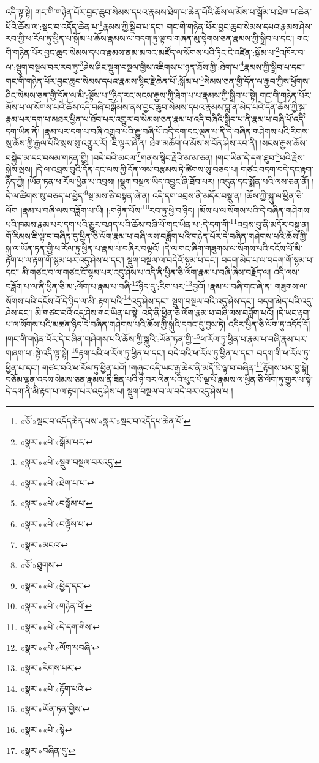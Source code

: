 འདི་ལྟ་སྟེ། གང་གི་གཉེན་པོར་བྱང་ཆུབ་སེམས་དཔའ་རྣམས་ཐེག་པ་ཆེན་པོའི་ཆོས་ལ་མོས་པ་སྒོམ་པ་ཐེག་པ་ཆེན་པོའི་ཆོས་ལ་:སྡང་བ་འདོད་ཆེན་པ་\footnote{«ཅོ་»སྡང་བ་འདོདཆེན་པས་«སྣར་»སྡང་བ་འདོདཔ་ཆེན་པོ་}རྣམས་ཀྱི་སྒྲིབ་པ་དང་། གང་གི་གཉེན་པོར་བྱང་ཆུབ་སེམས་དཔའ་རྣམས་ཤེས་རབ་ཀྱི་ཕ་རོལ་ཏུ་ཕྱིན་པ་སྒོམ་པ་ཆོས་རྣམས་ལ་བདག་ཏུ་ལྟ་བ་གཞན་མུ་སྟེགས་ཅན་རྣམས་ཀྱི་སྒྲིབ་པ་དང་། གང་གི་གཉེན་པོར་བྱང་ཆུབ་སེམས་དཔའ་རྣམས་ནམ་མཁའ་མཛོད་ལ་སོགས་པའི་ཏིང་ངེ་འཛིན་:སྒོམ་པ་\footnote{«སྣར་»«པེ་»སྒོམ་པར་}འཁོར་བ་ལ་:སྡུག་བསྔལ་བར་རབ་ཏུ་\footnote{«སྣར་»«པེ་»སྡུག་བསྔལ་བརའདུ་}ཤེས་ཤིང་སྡུག་བསྔལ་གྱིས་འཇིགས་པ་ཉན་ཐོས་ཀྱི་:ཐེག་པ་\footnote{«སྣར་»«པེ་»ཐེག་པ་པ་}རྣམས་ཀྱི་སྒྲིབ་པ་དང་། གང་གི་གཉེན་པོར་བྱང་ཆུབ་སེམས་དཔའ་རྣམས་སྙིང་རྗེ་ཆེན་པོ་:སྒོམ་པ་\footnote{«སྣར་»«པེ་»བསྒོམ་པ་}སེམས་ཅན་གྱི་དོན་ལ་རྒྱབ་ཀྱིས་ཕྱོགས་ཤིང་སེམས་ཅན་གྱི་དོན་ལ་མི་:ལྟོས་པ་\footnote{«སྣར་»«པེ་»བལྟོས་པ་}ཉིད་རང་སངས་རྒྱས་ཀྱི་ཐེག་པ་པ་རྣམས་ཀྱི་སྒྲིབ་པ་སྟེ། གང་གི་གཉེན་པོར་མོས་པ་ལ་སོགས་པའི་ཆོས་འདི་བཞི་བསྒོམས་ནས་བྱང་ཆུབ་སེམས་དཔའ་རྣམས་བླ་ན་མེད་པའི་དོན་ཆོས་ཀྱི་སྐུ་རྣམ་པར་དག་པ་མཐར་ཕྱིན་པ་ཐོབ་པར་འགྱུར་བ་སེམས་ཅན་རྣམ་པ་འདི་བཞིའི་སྒྲིབ་པ་ནི་རྣམ་པ་བཞི་པོ་འདི་དག་ཡིན་ནོ། །རྣམ་པར་དག་པ་བཞི་འགྲུབ་པའི་རྒྱུ་བཞི་པོ་འདི་དག་དང་ལྡན་པ་ནི་དེ་བཞིན་གཤེགས་པའི་རིགས་སུ་ཆོས་ཀྱི་རྒྱལ་པོའི་སྲས་སུ་འགྱུར་རོ། །ཇི་ལྟར་ཞེ་ན། ཐེག་མཆོག་ལ་མོས་ས་བོན་ཤེས་རབ་ནི། །སངས་རྒྱས་ཆོས་བསྐྱེད་མ་དང་བསམ་གཏན་གྱི། །བདེ་བའི་མངལ་\footnote{«སྣར་»མངའ་}གནས་སྙིང་རྗེའི་མ་མ་ཅན། །གང་ཡིན་དེ་དག་ཐུབ་\footnote{«ཅོ་»ཐུགས་}པའི་རྗེས་སྐྱེས་སྲས། །དེ་ལ་འབྲས་བུའི་དོན་དང་ལས་ཀྱི་དོན་ལས་བརྩམས་ཏེ་ཚིགས་སུ་བཅད་པ། གཙང་བདག་བདེ་དང་རྟག་ཉིད་ཀྱི། །ཡོན་ཏན་ཕ་རོལ་ཕྱིན་པ་འབྲས། །སྡུག་བསྔལ་ཡིད་འབྱུང་ཞི་ཐོབ་པར། །འདུན་དང་སྨོན་པའི་ལས་ཅན་ནོ། །དེ་ལ་ཚིགས་སུ་བཅད་པ་ཕྱེད་\footnote{«སྣར་»«པེ་»ཕྱེད་དང་}སྔ་མས་ཅི་བསྟན་ཞེ་ན། འདི་དག་འབྲས་ནི་མདོར་བསྡུ་ན། །ཆོས་ཀྱི་སྐུ་ལ་ཕྱིན་ཅི་ལོག །རྣམ་པ་བཞི་ལས་བཟློག་པ་ཡི། །:གཉེན་པོས་\footnote{«སྣར་»«པེ་»གཉེན་པོ་}རབ་ཏུ་ཕྱེ་བ་ཉིད། །མོས་པ་ལ་སོགས་པའི་དེ་བཞིན་གཤེགས་པའི་ཁམས་རྣམ་པར་དག་པའི་རྒྱུར་བཤད་པའི་ཆོས་བཞི་པོ་གང་ཡིན་པ་:དེ་དག་གི་\footnote{«སྣར་»«པེ་»དེ་དག་གིས་}འབྲས་བུ་ནི་མདོར་བསྡུ་ན། གོ་རིམས་ཇི་ལྟ་བ་བཞིན་དུ་ཕྱིན་ཅི་ལོག་རྣམ་པ་བཞི་ལས་བཟློག་པའི་གཉེན་པོར་དེ་བཞིན་གཤེགས་པའི་ཆོས་ཀྱི་སྐུ་ལ་ཡོན་ཏན་གྱི་ཕ་རོལ་ཏུ་ཕྱིན་པ་རྣམ་པ་བཞིར་བལྟའོ། །དེ་ལ་གང་ཞིག་གཟུགས་ལ་སོགས་པའི་དངོས་པོ་མི་རྟག་པ་ལ་རྟག་གོ་སྙམ་པར་འདུ་ཤེས་པ་དང་། སྡུག་བསྔལ་ལ་བདེའོ་སྙམ་པ་དང་། བདག་མེད་པ་ལ་བདག་གོ་སྙམ་པ་དང་། མི་གཙང་བ་ལ་གཙང་ངོ་སྙམ་པར་འདུ་ཤེས་པ་འདི་ནི་ཕྱིན་ཅི་ལོག་རྣམ་པ་བཞི་ཞེས་བརྗོད་ལ། འདི་ལས་བཟློག་པ་ལ་ནི་ཕྱིན་ཅི་མ་:ལོག་པ་རྣམ་པ་བཞི་\footnote{«སྣར་»«པེ་»ལོག་པབཞི་}ཉིད་དུ་:རིག་པར་\footnote{«སྣར་»རིགས་པར་}བྱའོ། །རྣམ་པ་བཞི་གང་ཞེ་ན། གཟུགས་ལ་སོགས་པའི་དངོས་པོ་དེ་ཉིད་ལ་མི་:རྟག་པའི་\footnote{«སྣར་»«པེ་»རྟོག་པའི་}འདུ་ཤེས་དང་། སྡུག་བསྔལ་བའི་འདུ་ཤེས་དང་། བདག་མེད་པའི་འདུ་ཤེས་དང་། མི་གཙང་བའི་འདུ་ཤེས་གང་ཡིན་པ་སྟེ། འདི་ནི་ཕྱིན་ཅི་ལོག་རྣམ་པ་བཞི་ལས་བཟློག་པའོ། །དེ་ཡང་རྟག་པ་ལ་སོགས་པའི་མཚན་ཉིད་དེ་བཞིན་གཤེགས་པའི་ཆོས་ཀྱི་སྐུའི་དབང་དུ་བྱས་ཏེ། འདིར་ཕྱིན་ཅི་ལོག་ཏུ་འདོད་དོ། །གང་གི་གཉེན་པོར་དེ་བཞིན་གཤེགས་པའི་ཆོས་ཀྱི་སྐུའི་:ཡོན་ཏན་གྱི་\footnote{«སྣར་»ཡོན་ཏན་གྱིས་}ཕ་རོལ་ཏུ་ཕྱིན་པ་རྣམ་པ་བཞི་རྣམ་པར་གཞག་པ་:སྟེ་འདི་ལྟ་སྟེ། \footnote{«སྣར་»«པེ་»སྟེ }རྟག་པའི་ཕ་རོལ་ཏུ་ཕྱིན་པ་དང་། བདེ་བའི་ཕ་རོལ་ཏུ་ཕྱིན་པ་དང་། བདག་གི་ཕ་རོལ་ཏུ་ཕྱིན་པ་དང་། གཙང་བའི་ཕ་རོལ་ཏུ་ཕྱིན་པའོ། །གཞུང་འདི་ཡང་རྒྱ་ཆེར་ནི་མདོ་ཇི་ལྟ་བ་བཞིན་\footnote{«སྣར་»བཞིན་དུ་}རྟོགས་པར་བྱ་སྟེ། བཅོམ་ལྡན་འདས་སེམས་ཅན་རྣམས་ནི་ཟིན་པའི་ཉེ་བར་ལེན་པའི་ཕུང་པོ་ལྔ་པོ་རྣམས་ལ་ཕྱིན་ཅི་ལོག་ཏུ་གྱུར་པ་སྟེ། དེ་དག་ནི་མི་རྟག་པ་ལ་རྟག་པར་འདུ་ཤེས་པ། སྡུག་བསྔལ་བ་ལ་བདེ་བར་འདུ་ཤེས་པ:། 
